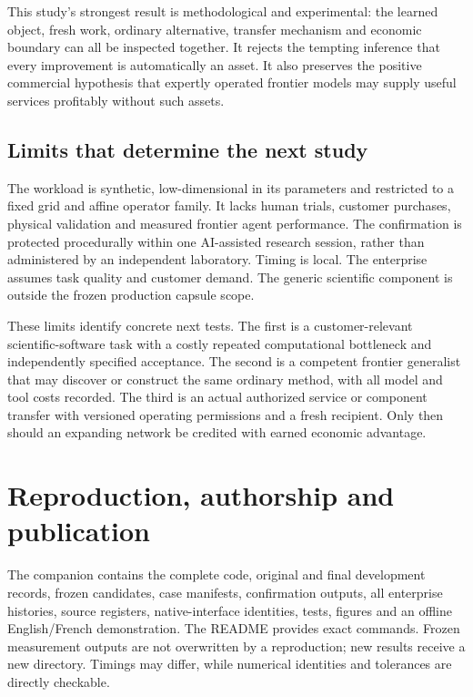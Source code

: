 \documentclass[11pt,letterpaper]{article}
\begin{document}
This study's strongest result is methodological and experimental: the learned object, fresh work, ordinary alternative, transfer mechanism and economic boundary can all be inspected together. It rejects the tempting inference that every improvement is automatically an asset. It also preserves the positive commercial hypothesis that expertly operated frontier models may supply useful services profitably without such assets.

\subsection{Limits that determine the next study}

The workload is synthetic, low-dimensional in its parameters and restricted to a fixed grid and affine operator family. It lacks human trials, customer purchases, physical validation and measured frontier agent performance. The confirmation is protected procedurally within one AI-assisted research session, rather than administered by an independent laboratory. Timing is local. The enterprise assumes task quality and customer demand. The generic scientific component is outside the frozen production capsule scope.

These limits identify concrete next tests. The first is a customer-relevant scientific-software task with a costly repeated computational bottleneck and independently specified acceptance. The second is a competent frontier generalist that may discover or construct the same ordinary method, with all model and tool costs recorded. The third is an actual authorized service or component transfer with versioned operating permissions and a fresh recipient. Only then should an expanding network be credited with earned economic advantage.

\section{Reproduction, authorship and publication}

The companion contains the complete code, original and final development records, frozen candidates, case manifests, confirmation outputs, all enterprise histories, source registers, native-interface identities, tests, figures and an offline English/French demonstration. The README provides exact commands. Frozen measurement outputs are not overwritten by a reproduction; new results receive a new directory. Timings may differ, while numerical identities and tolerances are directly checkable.
\end{document}
